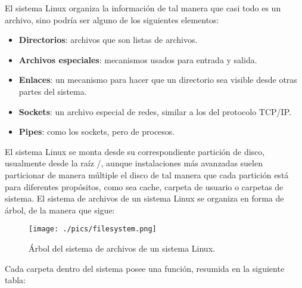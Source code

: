 \documentclass[11pt,letterpaper]{article} 	%
\begin{document}
El sistema Linux organiza la información de tal manera que casi todo es un archivo, sino podría ser alguno de los siguientes elementos:
\begin{itemize}
	\item \textbf{Directorios}: archivos que son listas de archivos.
	\item \textbf{Archivos especiales}: mecanismos usados para entrada y salida.
	\item \textbf{Enlaces}: un mecanismo para hacer que un directorio sea visible desde otras partes del sistema.
	\item \textbf{Sockets}: un archivo especial de redes, similar a los del protocolo TCP/IP.
	\item \textbf{Pipes}: como los sockets, pero de procesos.
\end{itemize}\par
El sistema Linux se monta desde su correspondiente partición de disco, usualmente desde la raíz /, aunque instalaciones más avanzadas suelen particionar de manera múltiple el disco de tal manera que cada partición está para diferentes propósitos, como sea cache, carpeta de usuario o carpetas de sistema. El sistema de archivos de un sistema Linux se organiza en forma de árbol, de la manera que sigue:
\begin{figure}[H]
  \begin{center}
    \texttt{[image: ./pics/filesystem.png]}
  \end{center}
  \vspace{-20pt}
  \caption{Árbol del sistema de archivos de un sistema Linux.}
  \vspace{-10pt}
\end{figure}
Cada carpeta dentro del sistema posee una función, resumida en la siguiente tabla:
\end{document}
